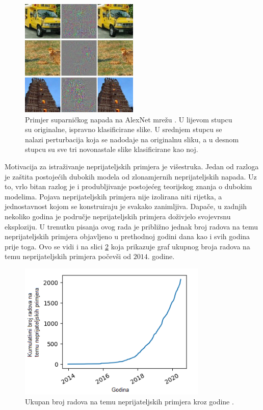 \documentclass[utf8, diplomski]{fer}
\begin{document}
\begin{figure}[H]
\centering
\includegraphics[width=0.5\textwidth,keepaspectratio]{img/other/alexnet_adv.jpg}
\caption{Primjer suparničkog napada na AlexNet mrežu \citep{Szegedy2014IntriguingPO}. U lijevom stupcu su originalne, ispravno klasificirane slike. U srednjem stupcu se nalazi perturbacija koja se nadodaje na originalnu sliku, a u desnom stupcu su sve tri novonastale slike klasificirane kao noj.}
\label{fig:alexnet_adv}
\end{figure}

\par
Motivacija za istraživanje neprijateljskih primjera je višestruka. Jedan od razloga je zaštita postojećih dubokih modela od zlonamjernih neprijateljskih napada. Uz to, vrlo bitan razlog je i produbljivanje postojećeg teorijskog znanja o dubokim modelima. Pojava neprijateljskih primjera nije izolirana niti rijetka, a jednostavnost kojom se konstruiraju je svakako zanimljiva. Dapače, u zadnjih nekoliko godina je područje neprijateljskih primjera doživjelo svojevrsnu eksploziju. U trenutku pisanja ovog rada je približno jednak broj radova na temu neprijateljskih primjera objavljeno u prethodnoj godini dana kao i svih godina prije toga. Ovo se vidi i na slici \ref{fig:cumsum_adv} koja prikazuje graf ukupnog broja radova na temu neprijateljskih primjera počevši od $2014.$ godine.

\begin{figure}[H]
\centering
\includegraphics[width=0.8\textwidth,keepaspectratio]{img/other/cumsum.png}
\caption{Ukupan broj radova na temu neprijateljskih primjera kroz godine \citep{carlini_webpage}.}
\label{fig:cumsum_adv}
\end{figure}
\end{document}
